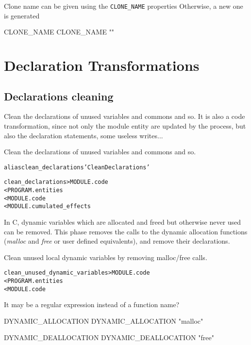 \documentclass[a4paper]{report}
\newenvironment{PipsMake}{\begin{alltt}}{\end{alltt}}
\newenvironment{PipsPass}[1]{\label{pass:#1}}{}
\begin{document}
Clone name can be given using the \lstinline|CLONE_NAME| properties
Otherwise, a new one is generated
\begin{PipsProp}{CLONE_NAME}
CLONE_NAME ""
\end{PipsProp}



\section{Declaration Transformations}

\subsection{Declarations cleaning}

Clean the declarations of unused variables and commons and so.
It is also a code transformation, since not only the module entity are
updated by the process, but also the declaration statements, some useless writes...

\begin{PipsPass}{clean_declarations}
Clean the declarations of unused variables and commons and so.
\end{PipsPass}

\begin{PipsMake}
alias clean_declarations 'Clean Declarations'

clean_declarations      > MODULE.code
        < PROGRAM.entities
        < MODULE.code
		< MODULE.cumulated_effects
\end{PipsMake}

In C, dynamic variables which are allocated and freed but otherwise
never used can be removed. This phase removes the calls to the
dynamic allocation functions (\emph{malloc} and \emph{free} or
user defined equivalents), and remove their declarations.

\begin{PipsPass}{clean_dynamic_variables}
Clean unused local dynamic variables by removing malloc/free calls.
\end{PipsPass}
\begin{PipsMake}
clean_unused_dynamic_variables > MODULE.code
	< PROGRAM.entities
	< MODULE.code
\end{PipsMake}

It may be a regular expression instead of a function name?
\begin{PipsProp}{DYNAMIC_ALLOCATION}
DYNAMIC_ALLOCATION "malloc"
\end{PipsProp}
\begin{PipsProp}{DYNAMIC_DEALLOCATION}
DYNAMIC_DEALLOCATION "free"
\end{PipsProp}
\end{document}
